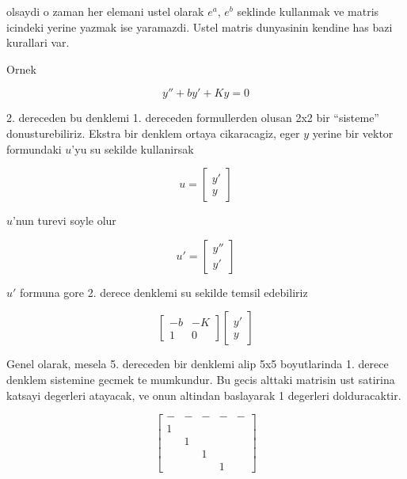 \documentclass[12pt,fleqn]{article}
\begin{document}
olsaydi o zaman her elemani ustel olarak $e^{a}$, $e^b$ seklinde kullanmak
ve matris icindeki yerine yazmak ise yaramazdi. Ustel matris dunyasinin
kendine has bazi kurallari var.

Ornek

\[ y'' + by' + Ky = 0 \]

2. dereceden bu denklemi 1. dereceden formullerden olusan 2x2 bir
``sisteme'' donusturebiliriz. Ekstra bir denklem ortaya cikaracagiz, eger
$y$ yerine bir vektor formundaki $u$'yu su sekilde kullanirsak

\[ u = 
\left[\begin{array}{c}
y' \\ y
\end{array}\right]
 \]

$u$'nun turevi soyle olur

\[ 
u' = 
\left[\begin{array}{c}
y'' \\ y'
\end{array}\right]
 \]

$u'$ formuna gore 2. derece denklemi su sekilde temsil edebiliriz

\[ 
\left[\begin{array}{cc}
-b & -K \\
1 & 0
\end{array}\right]
\left[\begin{array}{c}
y' \\ y
\end{array}\right]
 \]

Genel olarak, mesela 5. dereceden bir denklemi alip 5x5 boyutlarinda 1. 
derece denklem sistemine gecmek te mumkundur. Bu gecis alttaki matrisin 
ust satirina katsayi degerleri atayacak, ve onun altindan baslayarak 1 
degerleri dolduracaktir. 

\[ 
\left[\begin{array}{rrrrr}
- & - & - & - & - \\
1 &&&& \\
& 1 &&& \\
&& 1 && \\
&&& 1 & 
\end{array}\right]
 \]
\end{document}
